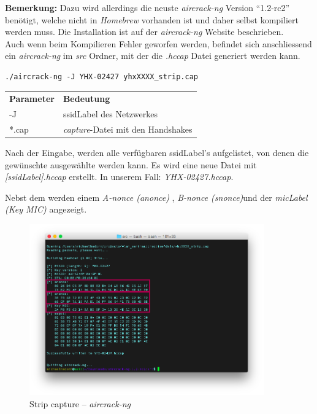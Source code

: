 \begin{framed}
	\textbf{Bemerkung:} Dazu wird allerdings die neuste \textit{aircrack-ng} Version "`1.2-rc2"' benötigt, welche nicht in \textit{Homebrew} vorhanden ist und daher selbst kompiliert werden muss. Die Installation ist auf der \textit{aircrack-ng} Website beschrieben.\\
	Auch wenn beim Kompilieren Fehler geworfen werden, befindet sich anschliessend ein \textit{aircrack-ng} im \textit{src} Ordner, mit der die \textit{.hccap} Datei generiert werden kann.
\end{framed}

\begin{lstlisting}[style=lstStyleFramed]
./aircrack-ng -J YHX-02427 yhxXXXX_strip.cap
\end{lstlisting}
\begin{tabular}{l l}
	\textbf{Parameter} & \textbf{Bedeutung}\\
	-J & \gls{ssidLabel} des Netzwerkes\\
	*.cap & \textit{capture}-Datei mit den Handshakes\\
\end{tabular}
Nach der Eingabe, werden alle verfügbaren \gls{ssidLabel}'s aufgelistet, von denen die gewünschte ausgewählte werden kann.
Es wird eine neue Datei mit \textit{[\gls{ssidLabel}].hccap} erstellt. In unserem Fall: \textit{YHX-02427.hccap}.

Nebst dem werden einem \textit{A-nonce (anonce)} , \textit{B-nonce (snonce)}und der \textit{\gls{micLabel} (Key MIC)} angezeigt.
\begin{figure}[H]
	\centering
	\includegraphics[width=0.9\textwidth]{images/wpa/conversion_cap2hccap.png}
	\caption{Strip capture -- \textit{aircrack-ng}}
\end{figure}

